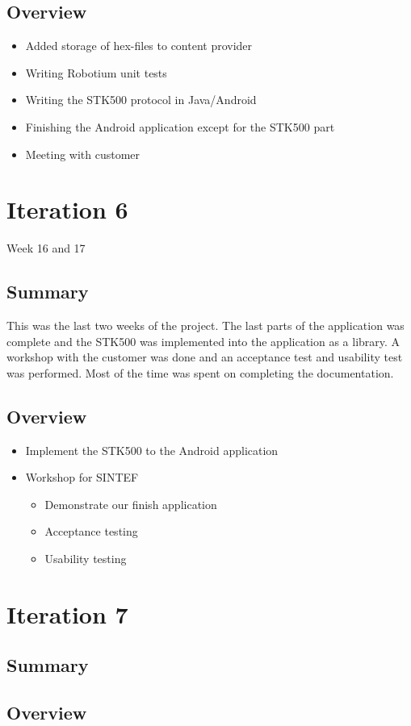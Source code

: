 \subsection{Overview}
\begin{itemize}
	\item{Added storage of hex-files to content provider}
	\item{Writing Robotium unit tests}
	\item{Writing the STK500 protocol in Java/Android}
	\item{Finishing the Android application except for the STK500 part}
	\item{Meeting with customer}
\end{itemize}

\section{Iteration 6}
Week 16 and 17

\subsection{Summary}
	This was the last two weeks of the project. The last parts of the application was complete and the STK500 was implemented into the application as a library.
	A workshop with the customer was done and an acceptance test and usability test was performed. Most of the time was spent on completing the documentation.

\subsection{Overview}
\begin{itemize}
	\item{Implement the STK500 to the Android application}
	\item{Workshop for SINTEF}
		\begin{itemize}
		\item{Demonstrate our finish application}
		\item{Acceptance testing}
		\item{Usability testing}
	\end{itemize}
\end{itemize}

\section{Iteration 7}

\subsection{Summary}

\subsection{Overview}
